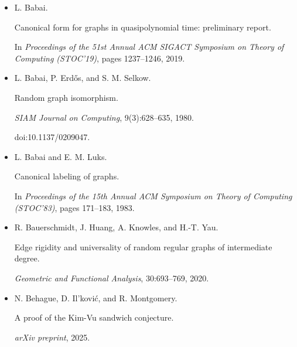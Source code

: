 \documentclass[10pt,a4paper]{article}
\begin{document}
\begin{itemize}
L. Babai.


Graph isomorphism in quasipolynomial time.


In \emph{Proceedings of the 48th Annual ACM Symposium on Theory of
Computing (STOC’16)}, pages 684–697, 2016.





\item[] 
[7]

L. Babai.


Canonical form for graphs in quasipolynomial time: preliminary
report.


In \emph{Proceedings of the 51st Annual ACM SIGACT Symposium on Theory
of Computing (STOC’19)}, pages 1237–1246, 2019.





\item[] 
[8]

L. Babai, P. Erdős, and S. M. Selkow.


Random graph isomorphism.


\emph{SIAM Journal on Computing}, 9(3):628–635, 1980.


doi:10.1137/0209047.





\item[] 
[9]

L. Babai and E. M. Luks.


Canonical labeling of graphs.


In \emph{Proceedings of the 15th Annual ACM Symposium on Theory of
Computing (STOC’83)}, pages 171–183, 1983.





\item[] 
[10]

R. Bauerschmidt, J. Huang, A. Knowles, and H.-T. Yau.


Edge rigidity and universality of random regular graphs of
intermediate degree.


\emph{Geometric and Functional Analysis}, 30:693–769, 2020.





\item[] 
[11]

N. Behague, D. Il’ković, and R. Montgomery.


A proof of the Kim-Vu sandwich conjecture.


\emph{arXiv preprint}, 2025.



\end{itemize}
\end{document}
